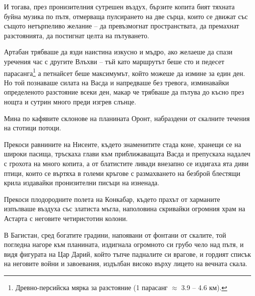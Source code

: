 И тогава, през пронизителния сутрешен въздух, бързите копита бият тяхната буйна
музика по пътя, отмерваща пулсирането на две сърца, които се движат със същото
нетърпеливо желание -- да превъзмогнат пространствата, да премахнат
разстоянията, да постигнат целта на пътуването.

Артабан трябваше да язди наистина изкусно и мъдро, ако желаеше да спази уречения
час с другите Влъхви -- тъй като маршрутът беше сто и педесет
парасанга\footnote{Древно-персийска мярка за разстояние (1 парасанг $\approx$
3.9 -- 4.6 км).} а петнайсет беше максимумът, който можеше да измине за един
ден. Но той познаваше силата на Васда и напредваше без тревога, изминавайки
определеното разстояние всеки ден, макар че трябваше да пътува до късно през
нощта и сутрин много преди изгрев слънце.

Мина по кафявите склонове на планината Оронт, набраздени от скалните течения
на стотици потоци.

Прекоси равнините на Нисеите, където знаменитите стада коне, хранещи се на
широки пасища, тръскаха глави към приближаващата Васда и препускаха надалеч с
грохота на много копита, а от блатистите ливади внезапно се издигаха ята диви
птици, които се въртяха в големи кръгове с размахването на безброй блестящи
крила издавайки пронизителни писъци на изненада.

Прекоси плодородните полета на Конкабар, където прахът от харманите
изпълваше въздуха със златиста мъгла, наполовина скривайки огромния храм на
Астарта с неговите четиристотин колони.

В Багистан, сред богатите градини, напоявани от фонтани от скалите, той погледна
нагоре към планината, издигнала огромното си грубо чело над пътя, и видя
фигурата на Цар Дарий, който тъпче падналите си врагове, и гордият списък на
неговите войни и завоевания, издълбан високо върху лицето на вечната скала.

